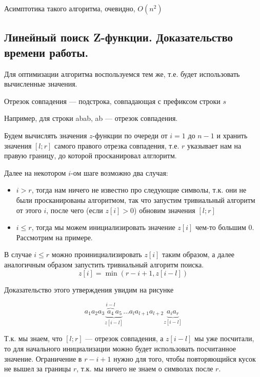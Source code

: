 \begin{remark}
	Асимптотика такого алгоритма, очевидно, $O(n^2)$
\end{remark}

\subsection{Линейный поиск Z-функции. Доказательство времени работы.}

Для оптимизации алгоритма воспользуемся тем же, т.е. будет использовать вычисленные значения.

\begin{definition}
	Отрезок совпадения --- подстрока, совпадающая с префиксом строки $s$
\end{definition}
Например, для строки abab, ab --- отрезок совпадения.

Будем вычислять значения $z$-функции по очереди от $i = 1$ до $n - 1$ и хранить значения $[l;r]$ самого правого
отрезка совпадения, т.е. $r$ указывает нам на правую границу, до которой просканировал алглоритм.

Далее на некотором $i$-ом шаге возможно два случая:
\begin{itemize}
	\item $i>r$, тогда нам ничего не известно про следующие символы, т.к. они не были просканированы
		алгоритмом, так что запустим тривиальный алгоритм от этого $i$, после чего (если $z[i] > 0$)
		обновим значения $[l;r]$ 
	\item $i \leq r$, тогда мы можем инициализировать значение $z[i]$ чем-то большим $0$. Рассмотрим на
		примере.
\end{itemize}

\begin{remark}
	В случае $i \leq r$ можно проинициализировать $z[i]$ таким образом, а далее аналогичным образом запустить
	тривиальный алгоритм поиска.
	\[
		z[i] = \min \left( r - i + 1, z[i-l] \right) 
	\] 
\end{remark}

Доказательство этого утверждения увидим на рисунке

\[
	a_1 a_2 a_3 \underbrace{\overbrace{a_4}^{i-l} a_5}_{z[i-l]} \ldots a_{l} a_{l+1} a_{l + 2} \underbrace{a_{i} a_{r}}_{z[i-l]} 
\] 

Т.к. мы знаем, что $[l;r]$ --- отрезок совпадения, а $z[i-l]$ мы уже посчитали, то для начального инициализации
можно будет использовать посчитанное значение. Ограничение в $r - i + 1$ нужно для того, чтобы повторяющийся
кусок не вышел за границы $r$, т.к. мы ничего не знаем о символах после $r$.


